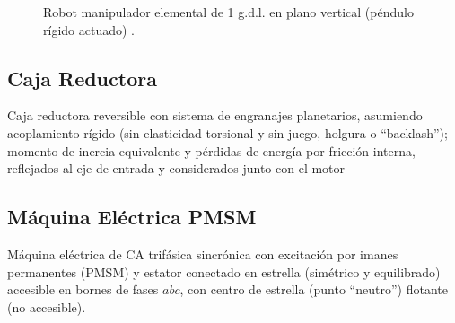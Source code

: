 \documentclass[a4paper, 10pt, onecolumn,journal]{ieeeconf}
\begin{document}
\begin{figure}[thpb]
    \centering
    \begin{adjustbox}{max width=0.5\columnwidth}
    \end{adjustbox}
    \caption{Robot manipulador elemental de 1 g.d.l. en plano vertical (péndulo rígido actuado) \cite{c2}.}
    \label{brazo}
\end{figure}

\subsection{\textbf{Caja Reductora}}
Caja reductora reversible con sistema de engranajes planetarios, asumiendo acoplamiento rígido (sin elasticidad torsional y sin juego, holgura o ``backlash''); momento de inercia equivalente y pérdidas de energía por fricción interna, reflejados al eje de entrada y considerados junto con el motor

\subsection{\textbf{Máquina Eléctrica PMSM}}
Máquina eléctrica de CA trifásica sincrónica con excitación por imanes permanentes (PMSM) y estator conectado en estrella (simétrico y equilibrado) accesible en bornes de fases $abc$, con centro de estrella (punto “neutro”) flotante (no accesible).
\end{document}
